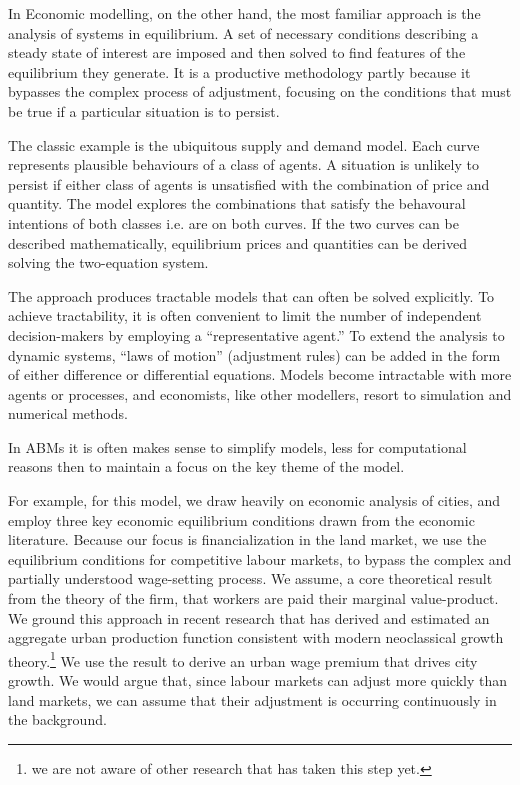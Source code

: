 In Economic modelling, on the other hand, the most familiar approach is the  analysis of systems in equilibrium. A set of necessary conditions describing a steady state of interest are imposed and then solved to find features of the equilibrium they generate. It is a productive methodology partly because it  bypasses the complex process of adjustment, focusing on the conditions that must be true if a particular situation is to persist.

The classic example is the ubiquitous supply and demand model. Each curve represents plausible behaviours of a class of agents. A situation is unlikely to persist if either class of agents is unsatisfied with the combination of price and quantity. The model explores the combinations %
that satisfy the behavoural intentions of both classes i.e. are on both curves. If the two curves can be described mathematically, equilibrium prices and quantities can be derived solving the two-equation system.

The approach produces tractable models that can often be solved explicitly. To achieve tractability, it is often convenient %
to limit the number of independent decision-makers by employing a ``representative agent.'' To extend the analysis to dynamic systems, ``laws of motion'' (adjustment rules) can be added in the form of either difference or differential equations.  Models become intractable with %
more agents or %
processes, and economists, like other modellers,  %
resort to simulation %
and numerical methods. 

In ABMs it is often makes sense to simplify models, less for computational reasons then to %
maintain a focus on the key theme  of the model.  %

For example, for this model, we draw heavily on economic analysis of cities, and employ three key economic equilibrium conditions drawn from the economic literature. 
Because our focus is financialization in the land market, we use the equilibrium conditions for competitive labour markets, to bypass the complex and partially understood wage-setting process. We assume, a core theoretical result from the theory of the firm, that workers are paid their marginal value-product. We ground this approach in recent research that has %
derived and estimated an aggregate urban production function consistent with modern neoclassical growth theory.\footnote{we are not aware of other research that has taken this step yet.} We use the result to derive an urban wage premium that drives city growth. We would argue that, since labour markets can adjust more quickly than land markets, we can assume that their adjustment is occurring continuously in the background. %

